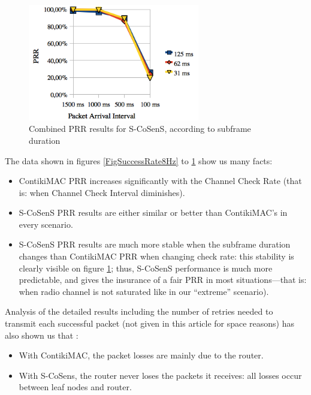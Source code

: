 \documentclass[conference]{IEEEtran}
\begin{document}
\begin{figure}[tbph]
  \centering
  \includegraphics[width=7.5cm]{graphes/PRRstabilitySCoSenS.png}
  \caption{Combined PRR results for S-CoSenS,
           according to subframe duration}
  \label{FigSuccessRateSCoSenS}
\end{figure}

The data shown in figures \ref{FigSuccessRate8Hz} to
\ref{FigSuccessRateSCoSenS} show us many facts:

\begin{itemize}

\item ContikiMAC PRR increases significantly with the Channel Check Rate
      (that is: when Channel Check Interval diminishes).

\item S-CoSenS PRR results are either similar or better than ContikiMAC's
      in every scenario.

\item S-CoSenS PRR results are much more stable when the subframe duration
      changes than ContikiMAC PRR when changing check rate: this stability
      is clearly visible on figure \ref{FigSuccessRateSCoSenS}; thus,
      S-CoSenS performance is much more predictable, and gives
      the insurance of a fair PRR in most situations---that is:
      when radio channel is not saturated like in our ``extreme''
      scenario).

\end{itemize}

Analysis of the detailed results including the number of retries needed
to transmit each successful packet (not given in this article for space
reasons) has also shown us that :

\begin{itemize}

\item With ContikiMAC, the packet losses are mainly due to the router.

\item With S-CoSens, the router never loses the packets it receives:
      all losses occur between leaf nodes and router.

\end{itemize}
\end{document}
